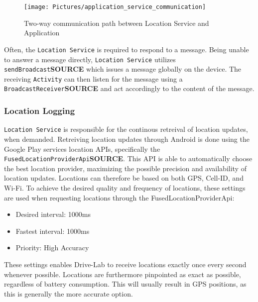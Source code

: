 \begin{figure}[tb]
\centering
\texttt{[image: Pictures/application\_service\_communication]}
\caption{Two-way communication path between Location Service and Application}
\label{fig:application_service_communication}
\end{figure}

Often, the \texttt{Location Service} is required to respond to a message. Being unable to answer a message directly, \texttt{Location Service} utilizes \texttt{sendBroadcast}\textbf{SOURCE} which issues a message globally on the device. The receiving \texttt{Activity} can then listen for the message using a \texttt{BroadcastReceiver}\textbf{SOURCE} and act accordingly to the content of the message. 

\subsubsection{Location Logging}\label{subsubsec:location_logging}
\texttt{Location Service} is responsible for the continous retreival of location updates, when demanded. Retreiving location updates through Android is done using the Google Play services location APIs, specifically the \texttt{FusedLocationProviderApi}\textbf{SOURCE}. This API is able to automatically choose the best location provider, maximizing the possible precision and availability of location updates. Locations can therefore be based on both GPS, Cell-ID, and Wi-Fi. To achieve the desired quality and frequency of locations, these settings are used when requesting locations through the FusedLocationProviderApi:

\begin{itemize}
\item Desired interval: 1000ms
\item Fastest interval: 1000ms
\item Priority: High Accuracy
\end{itemize}

These settings enables Drive-Lab to receive locations exactly once every second whenever possible. Locations are furthermore pinpointed as exact as possible, regardless of battery consumption. This will usually result in GPS positions, as this is generally the more accurate option.